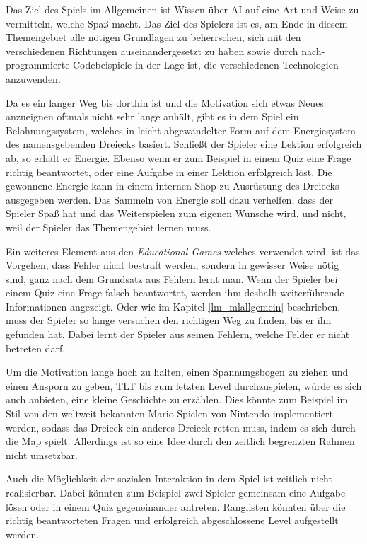 Das Ziel des Spiels im Allgemeinen ist Wissen über AI auf eine Art und Weise zu vermitteln, welche Spaß macht. Das Ziel des Spielers ist es, am Ende in diesem Themengebiet alle nötigen Grundlagen zu beherrschen, sich mit den verschiedenen Richtungen auseinandergesetzt zu haben sowie durch nach-programmierte Codebeispiele in der Lage ist, die verschiedenen Technologien anzuwenden. 

Da es ein langer Weg bis dorthin ist und die Motivation sich etwas Neues anzueignen oftmals nicht sehr lange anhält, gibt es in dem Spiel ein Belohnungssystem, welches in leicht abgewandelter Form auf dem Energiesystem des namensgebenden Dreiecks basiert. Schließt der Spieler eine Lektion erfolgreich ab, so erhält er Energie. Ebenso wenn er zum Beispiel in einem Quiz eine Frage richtig beantwortet, oder eine Aufgabe in einer Lektion erfolgreich löst. Die gewonnene Energie kann in einem internen Shop zu Ausrüstung des Dreiecks ausgegeben werden. Das Sammeln von Energie soll dazu verhelfen, dass der Spieler Spaß hat und das Weiterspielen zum eigenen Wunsche wird, und nicht, weil der Spieler das Themengebiet lernen muss.

Ein weiteres Element aus den \textit{Educational Games} welches verwendet wird, ist das Vorgehen, dass Fehler nicht bestraft werden, sondern in gewisser Weise nötig sind, ganz nach dem Grundsatz \glqq aus Fehlern lernt man\grqq. Wenn der Spieler bei einem Quiz eine Frage falsch beantwortet, werden ihm deshalb weiterführende Informationen angezeigt. Oder wie im Kapitel \ref{lm_mlallgemein} beschrieben, muss der Spieler so lange versuchen den richtigen Weg zu finden, bis er ihn gefunden hat. Dabei lernt der Spieler aus seinen Fehlern, welche Felder er nicht betreten darf.

Um die Motivation lange hoch zu halten, einen Spannungsbogen zu ziehen und einen Ansporn zu geben, TLT bis zum letzten Level durchzuspielen, würde es sich auch anbieten, eine kleine Geschichte zu erzählen. Dies könnte zum Beispiel im Stil von den weltweit bekannten Mario-Spielen von Nintendo \cite{F_Mario_4.3.3} implementiert werden, sodass das Dreieck ein anderes Dreieck retten muss, indem es sich durch die Map spielt. Allerdings ist so eine Idee durch den zeitlich begrenzten Rahmen nicht umsetzbar. 

Auch die Möglichkeit der sozialen Interaktion in dem Spiel ist zeitlich nicht realisierbar. Dabei könnten zum Beispiel zwei Spieler gemeinsam eine Aufgabe lösen oder in einem Quiz gegeneinander antreten. Ranglisten könnten über die richtig beantworteten Fragen und erfolgreich abgeschlossene Level aufgestellt werden.

